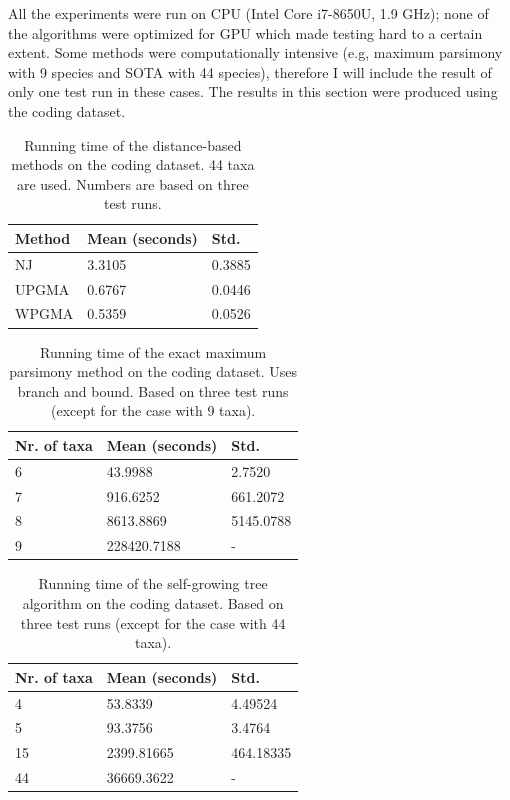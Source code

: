 \documentclass[11pt,twocolumn]{article}
\begin{document}
All the experiments were run on CPU (Intel Core i7-8650U, 1.9 GHz); none of the algorithms were optimized for GPU which made testing hard to a certain extent. Some methods were computationally intensive (e.g, maximum parsimony with 9 species and SOTA with 44 species), therefore I will include the result of only one test run in these cases. The results in this section were produced using the coding dataset.

\begin{table}[H]
\label{table:distance}
  \caption{Running time of the distance-based methods on the coding dataset. 44 taxa are used. Numbers are based on three test runs.}
  \centering
  \begin{tabular}{lll}
    \toprule
    Method & Mean (seconds) & Std. \\
    \midrule
    NJ & 3.3105 & 0.3885 \\
    UPGMA & 0.6767 & 0.0446 \\
    WPGMA & 0.5359 & 0.0526 \\	
    \bottomrule
  \end{tabular}
\end{table}

\begin{table}[H]
\label{table:mp}
  \caption{Running time of the exact maximum parsimony method on the coding dataset. Uses branch and bound. Based on three test runs (except for the case with 9 taxa).}
  \centering
  \begin{tabular}{lll}
    \toprule
    Nr. of taxa & Mean (seconds) & Std. \\
    \midrule
    6 & 43.9988 & 2.7520 \\
    7 & 916.6252 & 661.2072 \\
    8 & 8613.8869 & 5145.0788 \\
    9 & 228420.7188 & - \\
    \bottomrule
  \end{tabular}
\end{table}

\begin{table}[H]
\label{table:sota}
  \caption{Running time of the self-growing tree algorithm on the coding dataset. Based on three test runs (except for the case with 44 taxa).}
  \centering
  \begin{tabular}{lll}
    \toprule
    Nr. of taxa & Mean (seconds) & Std. \\
    \midrule
    4 & 53.8339 & 4.49524 \\
    5 & 93.3756 & 3.4764 \\
    15 & 2399.81665 & 464.18335 \\
    44 & 36669.3622 & - \\
    \bottomrule
  \end{tabular}
\end{table}
\end{document}
